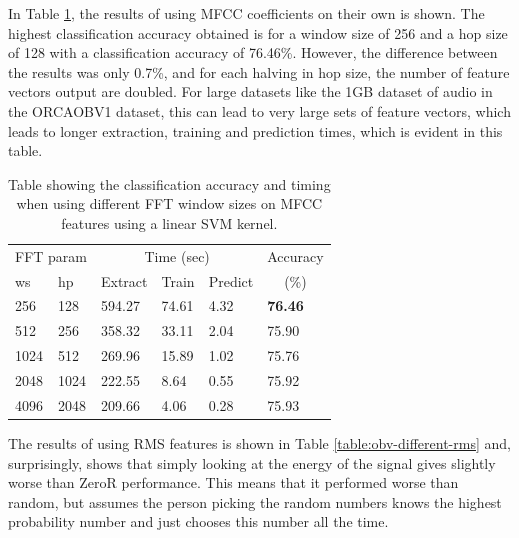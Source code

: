 In Table \ref{table:obv-different-mfcc}, the results of using MFCC
coefficients on their own is shown.  The highest classification
accuracy obtained is for a window size of 256 and a hop size of 128
with a classification accuracy of 76.46\%.  However, the difference
between the results was only 0.7\%, and for each halving in hop size,
the number of feature vectors output are doubled.  For large datasets
like the 1GB dataset of audio in the ORCAOBV1 dataset, this can lead to
very large sets of feature vectors, which leads to longer extraction,
training and prediction times, which is evident in this table.


\begin{table}
\begin{tabular}{|l|l|l|l|l|l|}
\hline
\multicolumn{2}{|c|}{FFT param} & \multicolumn{3}{c|}{Time (sec)} & Accuracy \\
\hhline{|-|-|-|-|-|~|}
ws & hp & Extract & Train & Predict & \multicolumn{1}{c|}{(\%)} \\
\hhline{|=|=|=|=|=|=|}
256 & 128    &   594.27  &   74.61  &   4.32  &  \textbf{76.46}  \\
512 & 256    &   358.32  &   33.11  &   2.04  &  75.90  \\
1024 & 512   &   269.96  &   15.89  &   1.02  &  75.76  \\
2048 & 1024  &   222.55  &    8.64  &   0.55  &  75.92  \\
4096 & 2048  &   209.66  &    4.06  &   0.28  &  75.93  \\
\hline
\end{tabular}
\caption{Table showing the classification accuracy and timing when
  using different FFT window sizes on MFCC features using a linear SVM
  kernel.}
\label{table:obv-different-mfcc}
\end{table}

The results of using RMS features is shown in Table
\ref{table:obv-different-rms} and, surprisingly, shows that simply
looking at the energy of the signal gives slightly worse than ZeroR
performance.  This means that it performed worse than random, but
assumes the person picking the random numbers knows the highest
probability number and just chooses this number all the time.

